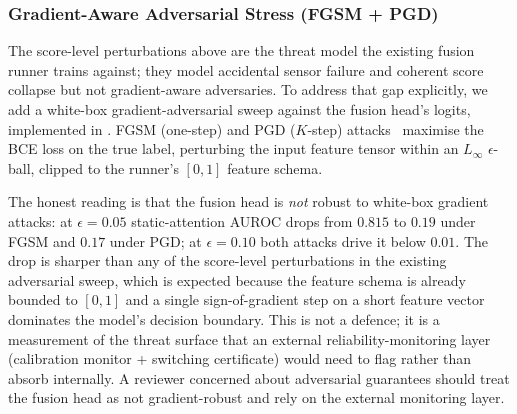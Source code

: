 \documentclass[10pt,conference]{IEEEtran}
\begin{document}
\subsubsection{Gradient-Aware Adversarial Stress (FGSM + PGD)}
\label{sec:gradient-adversarial}

The score-level perturbations above are the threat model the existing
fusion runner trains against; they model accidental sensor failure and
coherent score collapse but not gradient-aware adversaries. To address
that gap explicitly, we add a white-box gradient-adversarial sweep
against the fusion head's logits, implemented in
. FGSM (one-step)
and PGD ($K$-step) attacks~\cite{goodfellow2014explaining,madry2017towards}
maximise the BCE loss on the true label, perturbing the input feature
tensor within an $L_\infty$ $\epsilon$-ball, clipped to the runner's
$[0,1]$ feature schema.


The honest reading is that the fusion head is \emph{not} robust to
white-box gradient attacks: at $\epsilon=0.05$ static-attention AUROC
drops from $0.815$ to $0.19$ under FGSM and $0.17$ under PGD; at
$\epsilon=0.10$ both attacks drive it below $0.01$. The drop is
sharper than any of the score-level perturbations in the existing
adversarial sweep, which is expected because the feature schema is
already bounded to $[0,1]$ and a single sign-of-gradient step on a
short feature vector dominates the model's decision boundary. This is
not a defence; it is a measurement of the threat surface that an
external reliability-monitoring layer (calibration monitor +
switching certificate) would need to flag rather than
absorb internally. A reviewer concerned about adversarial guarantees
should treat the fusion head as not gradient-robust and rely on the
external monitoring layer.
\end{document}

